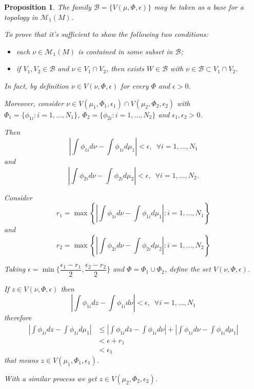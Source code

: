 \documentclass[a4paper]{article}
\theoremstyle{plain}
\newtheorem{prop} [theorem]{Proposition}
\theoremstyle{definition}
\begin{document}
    \begin{prop}
        The family $\mathcal{B} = \{V(\mu,\Phi,\epsilon)\}$  may be taken as a base for a topology in $\mathcal{M}_1(M)$.
        

        \proof To prove that it's sufficient to show the following two conditions:
        \begin{itemize}
            \item each $\nu \in \mathcal{M}_1(M)$ is contained in some subset in $\mathcal{B}$;
            \item if $V_1,V_2 \in \mathcal{B}$ and $\nu \in V_1 \cap V_2$, then exists $W \in \mathcal{B}$ with $\nu \in \mathcal{B} \subset V_1 \cap V_2$. 
        \end{itemize}

        In fact, by definition  $\nu \in V(\nu, \Phi, \epsilon)$ for every $\Phi$ and $\epsilon>0$. 

        Moreover, consider $\nu \in V(\mu_1, \Phi_1, \epsilon_1) \cap V(\mu_2, \Phi_2, \epsilon_2)$ with $\Phi_1 = \{\phi_{1i}: i=1,\dots,N_1\}$,
        $\Phi_2 = \{\phi_{2i}: i=1,\dots,N_2\}$ and $\epsilon_1,\epsilon_2>0$.
        
        Then
        $$ \left| \int \phi_{1i} d\nu - \int \phi_{1i} d\mu_1\right| < \epsilon, \,\,\, \forall i=1,\dots,N_1$$
and 
        $$ \left| \int \phi_{2i} d\nu - \int \phi_{2i} d\mu_2\right| < \epsilon, \,\,\, \forall i=1,\dots,N_2.$$

        Consider 
        $$ r_1 = \max\left\{ \left| \int \phi_{1i} d\nu - \int \phi_{1i} d\mu_1\right|: i=1,\dots,N_1\right\}$$
    and
        $$ r_2 = \max\left\{ \left| \int \phi_{2i} d\nu - \int \phi_{2i} d\mu_2\right|: i=1,\dots,N_2\right\}$$

        Taking $\epsilon = \min\{\dfrac{\epsilon_1-r_1}{2}, \dfrac{\epsilon_2-r_2}{2}\}$  and $\Phi = \Phi_1 \cup \Phi_2$, 
        define the set $V(\nu, \Phi, \epsilon)$. 

        If $z \in V(\nu, \Phi, \epsilon)$ then 
        $$ \left| \int \phi_{1i} dz - \int \phi_{1i} d\nu \right| < \epsilon, \,\,\, \forall i=1,\dots,N_1$$
 therefore 
        \begin{align*}
        \left| \int \phi_{1i} dz - \int \phi_{1i} d\mu_1 \right| &\leq 
        \left| \int \phi_{1i} dz - \int \phi_{1i} d\nu \right|
        +
        \left| \int \phi_{1i} d\nu - \int \phi_{1i} d\mu_1 \right|\\
        &< \epsilon + r_1\\
        &<\epsilon_1
        \end{align*}
that means $z \in V(\mu_1, \Phi_1, \epsilon_1)$.

    With a similar process we get $z \in V(\mu_2, \Phi_2, \epsilon_2)$.
        
    \end{prop}
    
\end{document}
